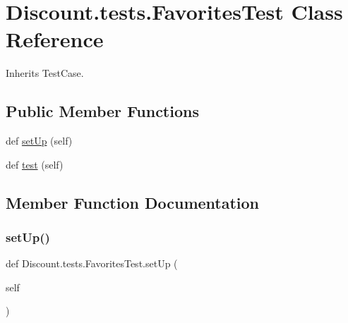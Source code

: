 \hypertarget{class_discount_1_1tests_1_1_favorites_test}{}\section{Discount.\+tests.\+Favorites\+Test Class Reference}
\label{class_discount_1_1tests_1_1_favorites_test}


Inherits Test\+Case.

\subsection*{Public Member Functions}
\begin{DoxyCompactItemize}
\item 
def \hyperlink{class_discount_1_1tests_1_1_favorites_test_aaaba080170bb2a4544732932b4383296}{set\+Up} (self)
\item 
def \hyperlink{class_discount_1_1tests_1_1_favorites_test_aa90e589059fce6e2882e902096427e53}{test} (self)
\end{DoxyCompactItemize}


\subsection{Member Function Documentation}
\mbox{\label{class_discount_1_1tests_1_1_favorites_test_aaaba080170bb2a4544732932b4383296}} 
\subsubsection{\texorpdfstring{set\+Up()}{setUp()}}
{\footnotesize\ttfamily def Discount.\+tests.\+Favorites\+Test.\+set\+Up (\begin{DoxyParamCaption}\item[{}]{self }\end{DoxyParamCaption})}

\mbox{\label{class_discount_1_1tests_1_1_favorites_test_aa90e589059fce6e2882e902096427e53}} 
